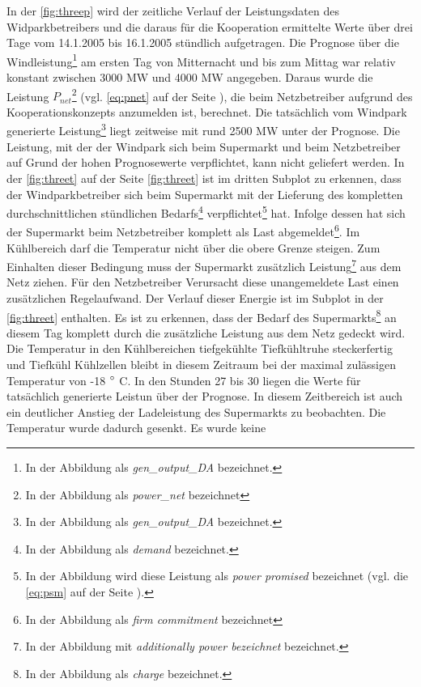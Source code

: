 In der \cref{fig:threep} wird der zeitliche Verlauf der Leistungsdaten des
Widparkbetreibers und die daraus f\"ur die Kooperation ermittelte Werte \"uber
drei Tage vom 14.1.2005 bis 16.1.2005 st\"undlich aufgetragen. Die Prognose
\"uber die Windleistung\footnote{ In der Abbildung als \textit{gen\_output\_DA}
bezeichnet.} am ersten Tag von Mitternacht und bis zum Mittag war relativ
konstant zwischen 3000 MW und 4000 MW angegeben. Daraus wurde die Leistung
$P_{net}$\footnote{ In der Abbildung als \textit{power\_net} bezeichnet} (vgl.
\cref{eq:pnet} auf der Seite \pageref{eq:pnet}), die beim Netzbetreiber aufgrund
des Kooperationskonzepts anzumelden ist, berechnet. Die tats\"achlich vom
Windpark generierte Leistung\footnote{ In der Abbildung als
\textit{gen\_output\_DA} bezeichnet.} liegt zeitweise mit rund 2500 MW unter der
Prognose. Die Leistung, mit der der Windpark sich beim Supermarkt und beim
Netzbetreiber auf Grund der hohen Prognosewerte verpflichtet, kann nicht
geliefert werden. In der \cref{fig:threet} auf der Seite \cref{fig:threet} ist
im dritten Subplot zu erkennen, dass der Windparkbetreiber sich beim Supermarkt
mit der Lieferung des kompletten durchschnittlichen st\"undlichen
Bedarfs\footnote{ In der Abbildung als \textit{demand} bezeichnet.}
verpflichtet\footnote{ In der Abbildung wird diese Leistung als \textit{power
promised} bezeichnet (vgl. die \cref{eq:psm} auf der Seite \pageref{eq:psm}).}
hat. Infolge dessen hat sich der Supermarkt beim Netzbetreiber komplett als Last
abgemeldet\footnote{ In der Abbildung als \textit{firm commitment} bezeichnet}.
Im K\"uhlbereich darf die Temperatur nicht \"uber die obere Grenze steigen. Zum
Einhalten dieser Bedingung muss der Supermarkt zus\"atzlich Leistung\footnote{
In der Abbildung mit \textit{additionally power bezeichnet} bezeichnet.}
aus dem Netz ziehen. F\"ur den Netzbetreiber Verursacht diese unangemeldete Last
einen zus\"atzlichen Regelaufwand. Der Verlauf dieser Energie ist im
Subplot in der \cref{fig:threet} enthalten. Es ist zu erkennen, dass der Bedarf
des Supermarkts\footnote{ In der Abbildung als \textit{charge} bezeichnet.} an
diesem Tag komplett durch die zus\"atzliche Leistung aus dem Netz gedeckt wird.
Die Temperatur in den K\"uhlbereichen tiefgek\"uhlte Tiefk\"uhltruhe
steckerfertig und Tiefk\"uhl K\"uhlzellen bleibt in diesem Zeitraum bei der
maximal zul\"assigen Temperatur von -18 $^\circ$ C. In den Stunden 27 bis 30
liegen die Werte f\"ur tats\"achlich generierte Leistun \"uber der Prognose. In
diesem Zeitbereich ist auch ein deutlicher Anstieg der Ladeleistung des
Supermarkts zu beobachten. Die Temperatur wurde dadurch gesenkt.  Es wurde keine
